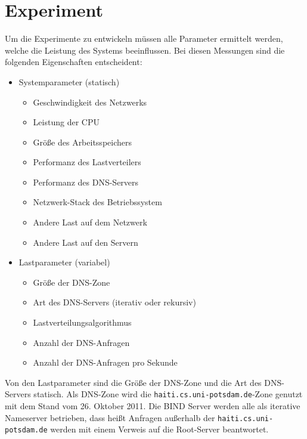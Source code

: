 \documentclass[a4paper, 12pt, BCOR10mm, DIV12, toc=bibliography, toc=listof, german]{scrbook}
\begin{document}

		\section{Experiment} %
		\label{sec:experiment}

			Um die Experimente zu entwickeln müssen alle Parameter ermittelt werden, welche die Leistung
			des Systems beeinflussen. Bei diesen Messungen sind die folgenden Eigenschaften entscheident:

			\begin{itemize}
				\item Systemparameter (statisch)
					\begin{itemize}
						\item Geschwindigkeit des Netzwerks
						\item Leistung der CPU
						\item Größe des Arbeitsspeichers
						\item Performanz des Lastverteilers
						\item Performanz des DNS-Servers
						\item Netzwerk-Stack des Betriebssystem
						\item Andere Last auf dem Netzwerk
						\item Andere Last auf den Servern
					\end{itemize}
				\item Lastparameter (variabel)
					\begin{itemize}
						\item Größe der DNS-Zone
						\item Art des DNS-Servers (iterativ oder rekursiv)
						\item Lastverteilungsalgorithmus
						\item Anzahl der DNS-Anfragen
						\item Anzahl der DNS-Anfragen pro Sekunde
					\end{itemize}
			\end{itemize}

			Von den Lastparameter sind die Größe der DNS-Zone und die Art des DNS-Servers statisch. Als
			DNS-Zone wird die \texttt{haiti.cs.uni-potsdam.de}-Zone genutzt mit dem Stand vom 26.
			Oktober 2011. Die BIND Server werden alle als iterative Nameserver betrieben, dass heißt
			Anfragen außerhalb der \texttt{haiti.cs.uni-potsdam.de} werden mit einem Verweis auf die
			Root-Server beantwortet.
\end{document}
